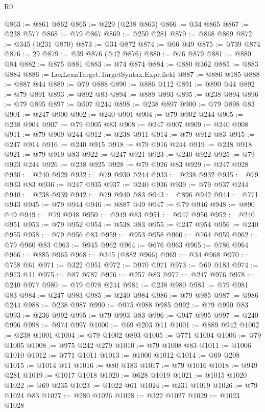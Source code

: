 \begin{lexlean}{R0}
\begin{coremodule}
@863 := @861 @862
@865 := @229 (@238 @863)
@866 := @34 @865
@867 := @238 @577
@868 := @79 @867
@869 := @250 @281
@870 := @868 @869
@872 := @345 (@231 @870)
@873 := @34 @872
@874 := @66 @49
@875 := @739 @874
@876 := 29
@879 := @39 @876 (@42 @876)
@880 := @76 @879
@881 := @880 @84
@882 := @875 @881
@883 := @74 @874
@884 := @880 @362
@885 := @883 @884
@886 := LexLeanTarget.TargetSyntax.Expr.field
@887 := @886 @185
@888 := @887 @44
@889 := @79 @888
@890 := @886 @112
@891 := @890 @44
@892 := @79 @891
@893 := @892 @83
@894 := @889 @893
@895 := @238 @894
@896 := @79 @895
@897 := @507 @244
@898 := @238 @897
@900 := @79 @898 @83
@901 := @247 @900
@902 := @240 @901
@904 := @79 @902 @244
@905 := @238 @904
@907 := @79 @905 @83
@908 := @247 @907
@909 := @240 @908
@911 := @79 @909 @244
@912 := @238 @911
@914 := @79 @912 @83
@915 := @247 @914
@916 := @240 @915
@918 := @79 @916 @244
@919 := @238 @918
@921 := @79 @919 @83
@922 := @247 @921
@923 := @240 @922
@925 := @79 @923 @244
@926 := @238 @925
@928 := @79 @926 @83
@929 := @247 @928
@930 := @240 @929
@932 := @79 @930 @244
@933 := @238 @932
@935 := @79 @933 @83
@936 := @247 @935
@937 := @240 @936
@939 := @79 @937 @244
@940 := @238 @939
@942 := @79 @940 @83
@943 := @896 @942
@944 := @771 @943
@945 := @79 @944
@946 := @887 @49
@947 := @79 @946
@948 := @890 @49
@949 := @79 @948
@950 := @949 @83
@951 := @947 @950
@952 := @240 @951
@953 := @79 @952
@954 := @538 @83
@955 := @247 @954
@956 := @240 @955
@958 := @79 @956 @83
@959 := @953 @958
@960 := @764 @959
@962 := @79 @960 @83
@963 := @945 @962
@964 := @676 @963
@965 := @786 @964
@966 := @885 @965
@968 := @345 (@882 @966)
@969 := @34 @968
@970 := @758 @61
@971 := @322 @951
@972 := @970 @971
@973 := @69 @183
@974 := @973 @11
@975 := @87 @787
@976 := @257 @83
@977 := @247 @976
@978 := @240 @977
@980 := @79 @978 @244
@981 := @238 @980
@983 := @79 @981 @83
@984 := @247 @983
@985 := @240 @984
@986 := @79 @985
@987 := @986 @244
@988 := @238 @987
@990 := @975 @988 @985
@992 := @79 @990 @83
@993 := @236 @992
@995 := @79 @993 @83
@996 := @947 @995
@997 := @240 @996
@998 := @974 @997
@1000 := @69 @203 @11
@1001 := @889 @942
@1002 := @238 @1001
@1004 := @79 @1002 @893
@1005 := @771 @1004
@1006 := @79 @1005
@1008 := @975 @242 @279
@1010 := @79 @1008 @83
@1011 := @1006 @1010
@1012 := @771 @1011
@1013 := @1000 @1012
@1014 := @69 @208
@1015 := @1014 @11
@1016 := @80 @183
@1017 := @79 @1016
@1018 := @949 @281
@1019 := @1017 @1018
@1020 := @628 @1019
@1021 := @1015 @1020
@1022 := @69 @235
@1023 := @1022 @61
@1024 := @231 @1019
@1026 := @79 @1024 @83
@1027 := @280 @1026
@1028 := @322 @1027
@1029 := @1023 @1028

\end{coremodule}
\end{lexlean}
